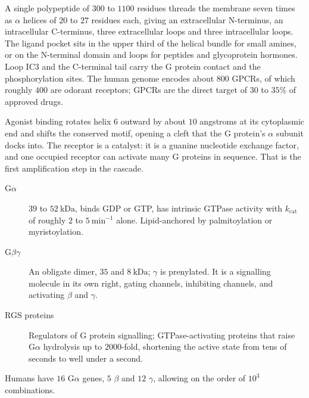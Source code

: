 \begin{keybox}[title={MEMORIZE: GPCR architecture and scale}]
A single polypeptide of $300$ to $1100$ residues threads the membrane seven times as
$\alpha$ helices of $20$ to $27$ residues each, giving an extracellular N-terminus, an
intracellular C-terminus, three extracellular loops and three intracellular loops.
The ligand pocket sits in the upper third of the helical bundle for small amines, or
on the N-terminal domain and loops for peptides and glycoprotein hormones. Loop
$\mathrm{IC}3$ and the C-terminal tail carry the G protein contact and the
phosphorylation sites. The human genome encodes about $800$ GPCRs, of which roughly
$400$ are odorant receptors; GPCRs are the direct target of $30$ to $35\%$ of
approved drugs.
\end{keybox}

Agonist binding rotates helix $6$ outward by about $10$ angstroms at its
cytoplasmic end and shifts the conserved  motif, opening a cleft that the
G protein's $\alpha$ subunit docks into. The receptor is a catalyst: it is a
guanine nucleotide exchange factor, and one occupied receptor can activate many
G proteins in sequence. That is the first amplification step in the cascade.

\begin{defbox}[title={DEFINITIONS: the heterotrimeric G protein}]
\begin{description}
\item[$\mathrm{G}\alpha$] $39$ to $52\ \mathrm{kDa}$, binds GDP or GTP, has intrinsic
GTPase activity with $k_{\text{cat}}$ of roughly $2$ to
$5\ \mathrm{min^{-1}}$ alone. Lipid-anchored by palmitoylation or myristoylation.
\item[$\mathrm{G}\beta\gamma$] An obligate dimer, $35$ and $8\ \mathrm{kDa}$;
$\gamma$ is prenylated. It is a signalling molecule in its own right, gating
  channels, inhibiting  channels, and activating
$\beta$ and $\gamma$.
\item[RGS proteins] Regulators of G protein signalling; GTPase-activating proteins
that raise $\mathrm{G}\alpha$ hydrolysis up to $2000$-fold, shortening the active
state from tens of seconds to well under a second.
\end{description}
Humans have $16$ $\mathrm{G}\alpha$ genes, $5$ $\beta$ and $12$ $\gamma$, allowing on
the order of $10^{3}$ combinations.
\end{defbox}

